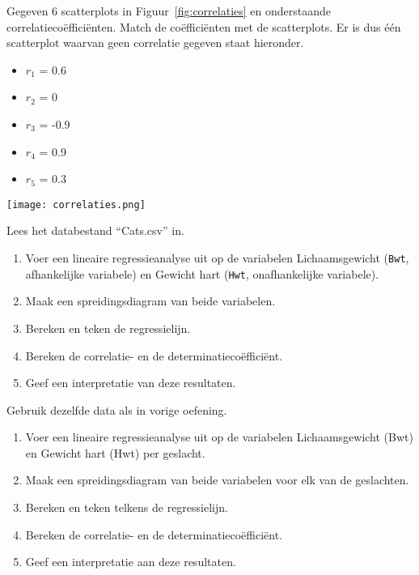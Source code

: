 \begin{exercise}
  \label{ex:scatter-correlatiecoeff}
  Gegeven 6 scatterplots in Figuur~\ref{fig:correlaties} en onderstaande correlatieco\"effici\"enten. Match de co\"effici\"enten met de scatterplots. Er is dus één scatterplot waarvan geen correlatie gegeven staat hieronder.
  \begin{itemize}
    \item $r_{1}$ = 0.6
    \item $r_{2}$ = 0
    \item $r_{3}$ = -0.9
    \item $r_{4}$ = 0.9
    \item $r_{5}$ = 0.3
  \end{itemize}
  \texttt{[image: correlaties.png]}
  \label{fig:correlaties}
\end{exercise}

\begin{exercise}
  \label{ex:cats}
  Lees het databestand ``Cats.csv'' in. 
  \begin{enumerate}
    \item Voer een lineaire regressieanalyse uit op de variabelen Lichaamsgewicht (\texttt{Bwt}, afhankelijke variabele) en Gewicht hart (\texttt{Hwt}, onafhankelijke variabele).
    \item Maak een spreidingsdiagram van beide variabelen.
    \item Bereken en teken de regressielijn.
    \item Bereken de correlatie- en de determinatiecoëfficiënt.
    \item Geef een interpretatie van deze resultaten.
  \end{enumerate}
\end{exercise}

\begin{exercise}
  \label{ex:cats-per-geslacht}
  Gebruik dezelfde data als in vorige oefening.
  \begin{enumerate}
    \item Voer een lineaire regressieanalyse uit op de variabelen Lichaamsgewicht (Bwt) en Gewicht hart (Hwt) per geslacht.
    \item Maak een spreidingsdiagram van beide variabelen voor elk van de geslachten.
    \item Bereken en teken telkens de regressielijn.
    \item Bereken de correlatie- en de determinatiecoëfficiënt.
    \item Geef een interpretatie aan deze resultaten.
  \end{enumerate}
\end{exercise}

